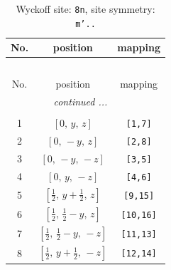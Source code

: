 \documentclass[fleqn,8pt]{jsarticle}
\begin{document}
\begin{longtable}{ccc}
\caption{Wyckoff site: {\tt 8n}, site symmetry: {\tt m'..}}
 \\
 \hline \hline
No. & position & mapping \\ \hline \endfirsthead

\multicolumn{2}{l}{\tablename\ \thetable{}} \\
 \hline \hline
No. & position & mapping \\ \hline \endhead

 \hline \hline
\multicolumn{2}{r}{\footnotesize\it continued ...} \\ \endfoot

 \hline \hline
\multicolumn{2}{r}{} \\ \endlastfoot

1 & $\left[ 0,\, y,\, z \right]$ & {\tt [1,7]} \\ \hline
2 & $\left[ 0,\, - y,\, z \right]$ & {\tt [2,8]} \\ \hline
3 & $\left[ 0,\, - y,\, - z \right]$ & {\tt [3,5]} \\ \hline
4 & $\left[ 0,\, y,\, - z \right]$ & {\tt [4,6]} \\ \hline
5 & $\left[ \frac{1}{2},\, y + \frac{1}{2},\, z \right]$ & {\tt [9,15]} \\ \hline
6 & $\left[ \frac{1}{2},\, \frac{1}{2} - y,\, z \right]$ & {\tt [10,16]} \\ \hline
7 & $\left[ \frac{1}{2},\, \frac{1}{2} - y,\, - z \right]$ & {\tt [11,13]} \\ \hline
8 & $\left[ \frac{1}{2},\, y + \frac{1}{2},\, - z \right]$ & {\tt [12,14]} \\
\end{longtable}
\renewcommand{\arraystretch}{1.2}
\end{document}
